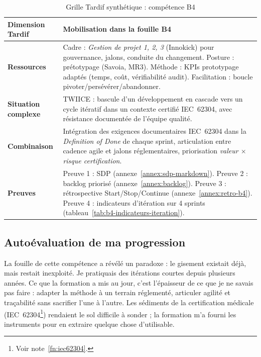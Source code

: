 \bigskip

\begin{table}[h!]
  \centering\small
  \caption{Grille Tardif synthétique : compétence B4}
  \label{tab:grille-tardif-b4}
  \begin{tabularx}{\textwidth}{@{} >{\bfseries}p{3.2cm} X @{}}
    \toprule
    Dimension Tardif & Mobilisation dans la fouille B4 \\
    \midrule
    Ressources & Cadre : \emph{Gestion de projet 1, 2, 3} (Innokick) pour gouvernance, jalons, conduite du changement. Posture : prétotypage (Savoia, MR3). Méthode : KPIs prototypage adaptés (temps, coût, vérifiabilité audit). Facilitation : boucle pivoter/persévérer/abandonner. \\
    \midrule
    Situation complexe & TWIICE : bascule d'un développement en cascade vers un cycle itératif dans un contexte certifié IEC~62304, avec résistance documentée de l'équipe qualité. \\
    \midrule
    Combinaison & Intégration des exigences documentaires IEC~62304 dans la \textit{Definition of Done} de chaque sprint, articulation entre cadence agile et jalons réglementaires, priorisation \emph{valeur $\times$ risque certification}. \\
    \midrule
    Preuves & Preuve 1 : SDP (annexe~\ref{annex:sdp-markdown}). Preuve 2 : backlog priorisé (annexe~\ref{annex:backlog}). Preuve 3 : rétrospective Start/Stop/Continue (annexe~\ref{annex:retro-b4}). Preuve 4 : indicateurs d'itération sur 4 sprints (tableau~\ref{tab:b4-indicateurs-iteration}). \\
    \bottomrule
  \end{tabularx}
\end{table}

\bigskip

\subsection{Autoévaluation de ma progression}

La fouille de cette compétence a révélé un paradoxe : le gisement existait déjà, mais restait inexploité. Je pratiquais des itérations courtes depuis plusieurs années. Ce que la formation a mis au jour, c'est l'épaisseur de ce que je ne savais pas faire : adapter la méthode à un terrain réglementé, articuler agilité et traçabilité sans sacrifier l'une à l'autre. Les sédiments de la certification médicale (IEC~62304\footnote{Voir note~\ref{fn:iec62304}.}) rendaient le sol difficile à sonder ; la formation m'a fourni les instruments pour en extraire quelque chose d'utilisable.

